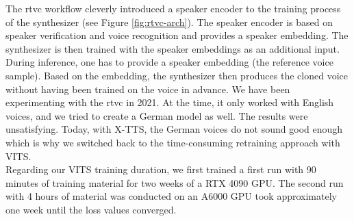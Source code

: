 \documentclass[
  a4paper,  %
  twoside,  %
  bibliography=totoc,
  headsepline,
  cleardoublepage=empty,
  parskip=half,
  draft=false
]{scrbook}
\begin{document}
The \gls{rtvc} workflow cleverly introduced a speaker encoder to the training process of the synthesizer (see Figure \ref{fig:rtvc-arch}). The speaker encoder is based on speaker verification and voice recognition and provides a speaker embedding. The synthesizer is then trained with the speaker embeddings as an additional input. During inference, one has to provide a speaker embedding (the reference voice sample). Based on the embedding, the synthesizer then produces the cloned voice without having been trained on the voice in advance. We have been experimenting with the \gls{rtvc} in 2021. At the time, it only worked with English voices, and we tried to create a German model as well. The results were unsatisfying. Today, with X-TTS, the German voices do not sound good enough which is why we switched back to the time-consuming retraining approach with VITS. \\
Regarding our VITS training duration, we first trained a first run with 90 minutes of training material for two weeks of a RTX 4090 GPU. The second run with 4 hours of material was conducted on an A6000 GPU took approximately one week until the loss values converged. 
\end{document}
